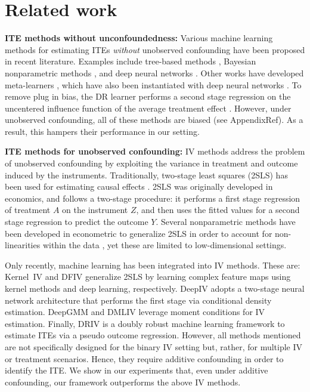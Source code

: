 \documentclass[nonatbib]{article}
\newcommand{\TODO}[1]{{\color{red}#1}}
\theoremstyle{definition}
\theoremstyle{plain}
\begin{document}
\section{Related work}

\textbf{ITE methods without unconfoundedness:} Various machine learning methods for estimating ITEs \emph{without} unobserved confounding have been proposed in recent literature. Examples include tree-based methods \cite{Wager.2018}, Bayesian nonparametric methods \cite{Alaa.2017}, and deep neural networks \cite{Shalit.2017, Yoon.2018, Zhang.2020}. Other works have developed meta-learners \cite{Kunzel.2019}, which have also been instantiated with deep neural networks \cite{Curth.2021}. To remove plug in bias, the DR learner performs a second stage regression on the uncentered influence function of the average treatment effect \cite{Kennedy.2020, Curth.2020}. However, under unobserved confounding, all of these methods are biased (see Appendix\TODO{Ref}). As a result, this hampers their performance in our setting. 


\textbf{ITE methods for unobserved confounding:}
IV methods address the problem of unobserved confounding by exploiting the variance in treatment and outcome induced by the instruments. Traditionally, two-stage least squares (2SLS) has been used for estimating causal effects \cite{Wright.1928, Angrist.1991}. 2SLS was originally developed in economics, and follows a two-stage procedure: it performs a first stage regression of treatment $A$ on the instrument $Z$, and then uses the fitted values for a second stage regression to predict the outcome $Y$. Several nonparametric methods have been developed in econometric to generalize 2SLS in order to account for non-linearities within the data \cite{Newey.2003, Wang.2021}, yet these are limited to low-dimensional settings.

Only recently, machine learning has been integrated into IV methods. These are: Kernel~IV \cite{Singh.2019} and DFIV \cite{Xu.2021} generalize 2SLS by learning complex feature maps using kernel methods and deep learning, respectively. DeepIV \cite{Hartford.2017} adopts a two-stage neural network architecture that performs the first stage via conditional density estimation. DeepGMM \cite{Bennett.2019} and DMLIV \cite{Syrgkanis.2019} leverage moment conditions for IV estimation. Finally, DRIV \cite{Syrgkanis.2019} is a doubly robust machine learning framework to estimate ITEs via a pseudo outcome regression. However, all methods mentioned are not specifically designed for the binary IV setting but, rather, for multiple IV or treatment scenarios. Hence, they require additive confounding in order to identify the ITE. We show in our experiments that, even under additive confounding, our framework outperforms the above IV methods.
\end{document}
